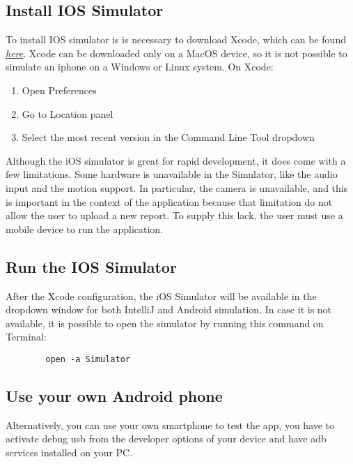 \documentclass[../ITD.tex]{subfiles}
\begin{document}
    \subsection{Install IOS Simulator}\label{subsec:install-ios-emulator-on-android-studio}
    To install IOS simulator is is necessary to download Xcode, which can be found
    \href{https://apps.apple.com/it/app/xcode/id497799835?mt=12}{\textit{here}}.
    Xcode can be downloaded only on a MacOS device, so it is not possible to simulate an iphone on a Windows or Linux system.
    On Xcode:
    \begin{enumerate}
        \item Open Preferences
        \item Go to Location panel
        \item Select the most recent version in the Command Line Tool dropdown
    \end{enumerate}
    Although the iOS simulator is great for rapid development, it does come with a few limitations.
    Some hardware is unavailable in the Simulator, like the audio input and the motion support.
    In particular, the camera is unavailable, and this is important in the context of the application because that limitation do not allow the user to upload a new report.
    To supply this lack, the user must use a mobile device to run the application.

    \subsection{Run the IOS Simulator}\label{subsec:run-the-ios-simulator}
    After the Xcode configuration, the iOS Simulator will be available in the dropdown window for both IntelliJ and Android simulation.
    In case it is not available, it is possible to open the simulator by running this command on Terminal:
    \begin{verbatim}
        open -a Simulator
    \end{verbatim}

    \subsection{Use your own Android phone}\label{subsec:use-your-own-android-phone}
    Alternatively, you can use your own smartphone to test the app, you have to activate debug usb from
    the developer options of your device and have adb services installed on your PC.
\end{document}
